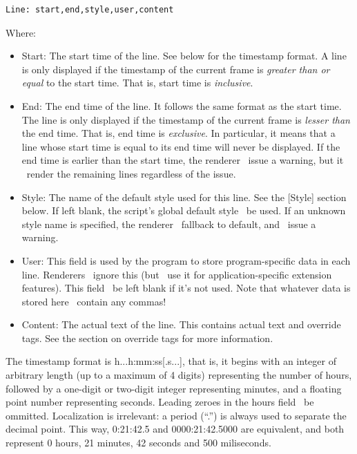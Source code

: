 \documentclass{spec}
\begin{document}
\begin{verbatim}
Line: start,end,style,user,content
\end{verbatim}

Where:

\begin{itemize}
\item Start: The start time of the line. See below for the timestamp format. A line is only displayed if
the timestamp of the current frame is \emph{greater than or equal} to the start time. That is, start
time is \emph{inclusive}.
\item End: The end time of the line. It follows the same format as the start time. The line is only
displayed if the timestamp of the current frame is \emph{lesser than} the end time. That is, end time is
\emph{exclusive}. In particular, it means that a line whose start time is equal to its end time will
never be displayed. If the end time is earlier than the start time, the renderer \may\ issue a warning,
but it \should\ render the remaining lines regardless of the issue.
\item Style: The name of the default style used for this line. See the [Style] section below. If left blank,
the script's global default style \must\ be used. If an unknown style name is specified, the renderer \must\
fallback to default, and \may\ issue a warning.
\item User: This field is used by the program to store program-specific data in each line. Renderers
\should\ ignore this (but \may\ use it for application-specific extension features). This field \should\
be left blank if it's not used. Note that whatever data is stored here \mustnot\ contain any commas!
\item Content: The actual text of the line. This contains actual text and override tags. See the section
on override tags for more information.
\end{itemize}

The timestamp format is h...h:mm:ss[.s...], that is, it begins with an integer of arbitrary length
(up to a maximum of 4 digits) representing the number of hours, followed by a one-digit or two-digit integer
representing minutes, and a floating point number representing seconds. Leading zeroes in the hours field \may\
be ommitted. Localization is irrelevant: a period (``.'') is always used to separate the decimal point.
This way, 0:21:42.5 and 0000:21:42.5000 are equivalent, and both represent 0 hours, 21 minutes, 42 seconds
and 500 miliseconds.
\end{document}

